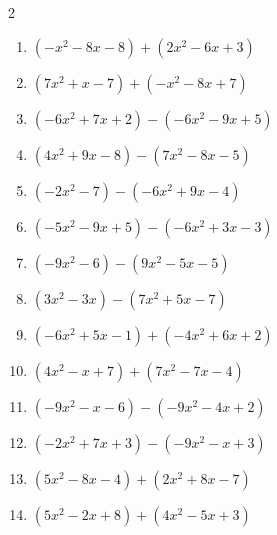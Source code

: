 \begin{multicols}{2}
\begin{enumerate}
  \item $(-x^{2}-8x-8)+(2x^{2}-6x+3)$


  \item $(7x^{2}+x-7)+(-x^{2}-8x+7)$


  \item $(-6x^{2}+7x+2)-(-6x^{2}-9x+5)$

        \phantom{$=16x-3$}

  \item $(4x^{2}+9x-8)-(7x^{2}-8x-5)$


  \item $(-2x^{2}-7)-(-6x^{2}+9x-4)$


  \item $(-5x^{2}-9x+5)-(-6x^{2}+3x-3)$


  \item $(-9x^{2}-6)-(9x^{2}-5x-5)$


  \item $(3x^{2}-3x)-(7x^{2}+5x-7)$


  \item $(-6x^{2}+5x-1)+(-4x^{2}+6x+2)$


  \item $(4x^{2}-x+7)+(7x^{2}-7x-4)$


  \item $(-9x^{2}-x-6)-(-9x^{2}-4x+2)$

        \phantom{$=3x-8$}

  \item $(-2x^{2}+7x+3)-(-9x^{2}-x+3)$


  \item $(5x^{2}-8x-4)+(2x^{2}+8x-7)$


  \item $(5x^{2}-2x+8)+(4x^{2}-5x+3)$


\end{enumerate}
\end{multicols}
